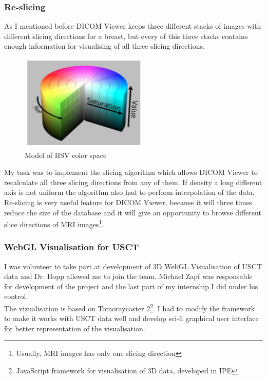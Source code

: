 \documentclass[english]{article}
\begin{document}
\subsubsection{Re-slicing}

As I mentioned before DICOM Viewer keeps three different stacks of images with different slicing directions for a breast, but every of this three stacks contains enough information for visualising of all three slicing directions.\\
\begin{figure}[H]
\centerline{\includegraphics[scale=0.7]{internship_report/model}}
\caption{Model of HSV color space\label{fig:model}}
\end{figure}
My task was to implement the slicing algorithm which allows DICOM Viewer to recalculate all three slicing directions from any of them. If density a long different axis is not uniform the algorithm also had to perform interpolation of the data.\\

Re-slicing is very useful feature for DICOM Viewer, because it will three times reduce the size of the database and it will give an opportunity to browse different slice directions of MRI images\footnote{Usually, MRI images has only one slicing direction}.\\

\subsubsection{WebGL Visualisation for USCT}

I was volunteer to take part at development of 3D WebGL Visualisation of USCT data and Dr. Hopp allowed me to join the team. Michael Zapf was responsable for development of the project and the last part of my internship I did under his control.\\

The vizualisation is based on Tomoraycaster 2\footnote{JavaScript framework for visualisation of 3D data, developed in IPE}. I had to modify the framework to make it works with USCT data well and develop sci-fi graphical user interface for better representation of the visualisation.\\
\end{document}
